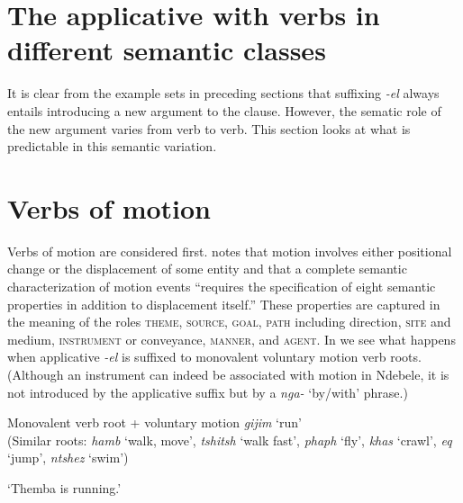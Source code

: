 \documentclass[output=paper]{langsci/langscibook}
\begin{document}
\section{The applicative with verbs in different semantic classes}\label{sec:sibanda:}

It is clear from the example sets in preceding sections that suffixing \textit{-el} always entails introducing a new argument to the clause. However, the sematic role of the new argument varies from verb to verb. This section looks at what is predictable in this semantic variation.

\section{Verbs of motion} \label{sec:sibanda:}

Verbs of motion are considered first. \citet[171]{Frawley1992} notes that motion involves either positional change or the displacement of some entity and that a complete semantic characterization of motion events “requires the specification of eight semantic properties in addition to displacement itself.” These properties are captured in the meaning of the roles \textsc{theme}, \textsc{source}, \textsc{goal}, \textsc{path} including direction, \textsc{site} and medium, \textsc{instrument} or conveyance, \textsc{manner}, and \textsc{agent}. In  we see what happens when applicative \textit{-el} is suffixed to monovalent voluntary motion verb roots. (Although an instrument can indeed be associated with motion in Ndebele, it is not introduced by the applicative suffix but by a \textit{nga-} ‘by/with’ phrase.)

\ea\label{ex:sibanda:5}
\settowidth{}
{Monovalent verb root + voluntary motion \textit{gijim} ‘run’}\\
 (Similar roots: \textit{hamb} ‘walk, move’, \textit{tshitsh} ‘walk fast’, \textit{phaph} ‘fly’, \textit{khas} ‘crawl’, \textit{eq} ‘jump’, \textit{ntshez} ‘swim’)\\
 

\glt ‘Themba is running.’

\end{document}
